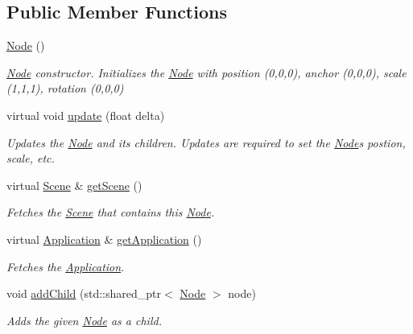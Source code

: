 \subsection*{Public Member Functions}
\begin{DoxyCompactItemize}
\item 
\mbox{\hyperlink{classsage_1_1Node_ad7a34779cad45d997bfd6d3d8043c75f}{Node}} ()
\begin{DoxyCompactList}\small\item\em \mbox{\hyperlink{classsage_1_1Node}{Node}} constructor. Initializes the \mbox{\hyperlink{classsage_1_1Node}{Node}} with position (0,0,0), anchor (0,0,0), scale (1,1,1), rotation (0,0,0) \end{DoxyCompactList}\item 
virtual void \mbox{\hyperlink{classsage_1_1Node_a32878481ba54b3856ab53c10af13848e}{update}} (float delta)
\begin{DoxyCompactList}\small\item\em Updates the \mbox{\hyperlink{classsage_1_1Node}{Node}} and its children. Updates are required to set the \mbox{\hyperlink{classsage_1_1Node}{Node}}\textquotesingle{}s postion, scale, etc. \end{DoxyCompactList}\item 
virtual \mbox{\hyperlink{classsage_1_1Scene}{Scene}} \& \mbox{\hyperlink{classsage_1_1Node_aba969bc78f15ce97c09011b35f61b651}{get\+Scene}} ()
\begin{DoxyCompactList}\small\item\em Fetches the \mbox{\hyperlink{classsage_1_1Scene}{Scene}} that contains this \mbox{\hyperlink{classsage_1_1Node}{Node}}. \end{DoxyCompactList}\item 
virtual \mbox{\hyperlink{classsage_1_1Application}{Application}} \& \mbox{\hyperlink{classsage_1_1Node_a94ddcfcf924b47e46cda2665328f6595}{get\+Application}} ()
\begin{DoxyCompactList}\small\item\em Fetches the \mbox{\hyperlink{classsage_1_1Application}{Application}}. \end{DoxyCompactList}\item 
void \mbox{\hyperlink{classsage_1_1Node_a248ad6b9a12f2a7608e6c2ed167d0c5e}{add\+Child}} (std\+::shared\+\_\+ptr$<$ \mbox{\hyperlink{classsage_1_1Node}{Node}} $>$ node)
\begin{DoxyCompactList}\small\item\em Adds the given \mbox{\hyperlink{classsage_1_1Node}{Node}} as a child. \end{DoxyCompactList}\item 

\end{DoxyCompactItemize}
